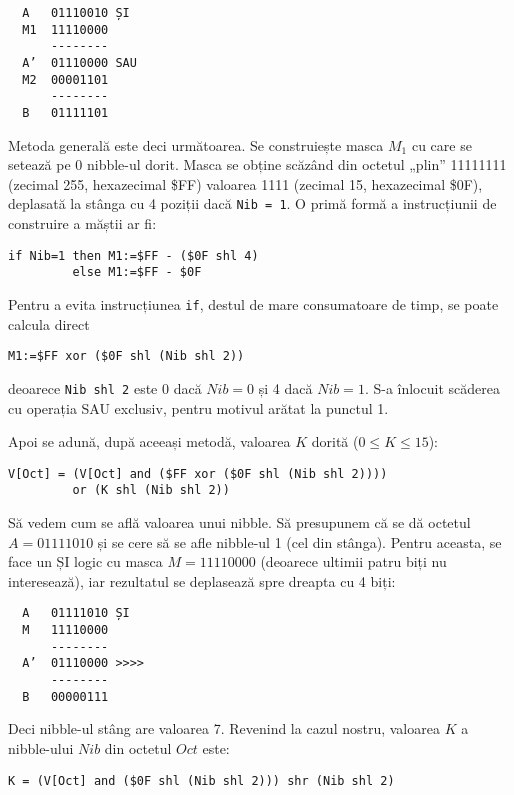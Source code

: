 \begin{verbatim}
  A   01110010 ȘI
  M1  11110000
      --------
  A’  01110000 SAU
  M2  00001101
      --------
  B   01111101
\end{verbatim}

Metoda generală este deci următoarea. Se construiește masca $M_1$ cu care se
setează pe 0 nibble-ul dorit. Masca se obține scăzând din octetul „plin”
11111111 (zecimal 255, hexazecimal \$FF) valoarea 1111 (zecimal 15,
hexazecimal \$0F), deplasată la stânga cu 4 poziții dacă {\tt Nib = 1}. O
primă formă a instrucțiunii de construire a măștii ar fi:

\begin{verbatim}
if Nib=1 then M1:=$FF - ($0F shl 4)
         else M1:=$FF - $0F
\end{verbatim}

Pentru a evita instrucțiunea {\tt if}, destul de mare consumatoare de timp, se
poate calcula direct

\begin{verbatim}
M1:=$FF xor ($0F shl (Nib shl 2))
\end{verbatim}

deoarece {\tt Nib shl 2} este 0 dacă $Nib = 0$ și 4 dacă $Nib = 1$. S-a
înlocuit scăderea cu operația SAU exclusiv, pentru motivul arătat la punctul
1.

Apoi se adună, după aceeași metodă, valoarea $K$ dorită ($0 \leq K \leq 15$):

\begin{verbatim}
V[Oct] = (V[Oct] and ($FF xor ($0F shl (Nib shl 2))))
         or (K shl (Nib shl 2))
\end{verbatim}

Să vedem cum se află valoarea unui nibble. Să presupunem că se dă octetul $A =
01111010$ și se cere să se afle nibble-ul 1 (cel din stânga). Pentru aceasta,
se face un ȘI logic cu masca $M = 11110000$ (deoarece ultimii patru biți nu
interesează), iar rezultatul se deplasează spre dreapta cu 4 biți:

\begin{verbatim}
  A   01111010 ȘI
  M   11110000
      --------
  A’  01110000 >>>>
      --------
  B   00000111
\end{verbatim}

Deci nibble-ul stâng are valoarea 7. Revenind la cazul nostru, valoarea $K$ a
nibble-ului $Nib$ din octetul $Oct$ este:

\begin{verbatim}
K = (V[Oct] and ($0F shl (Nib shl 2))) shr (Nib shl 2)
\end{verbatim}

